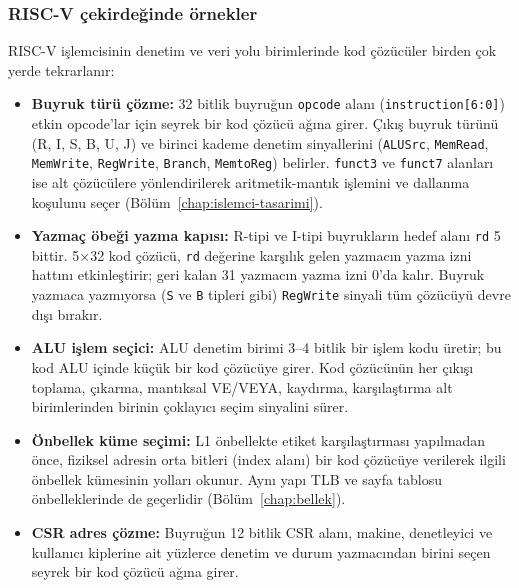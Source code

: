 \begin{ornek}[B.10]
\begin{center}
\end{center}
\end{ornek}


\subsubsection{RISC-V çekirdeğinde örnekler}
RISC-V işlemcisinin denetim ve veri yolu birimlerinde kod çözücüler birden çok yerde tekrarlanır:

\begin{itemize}[nosep]
  \item \textbf{Buyruk türü çözme:} 32 bitlik buyruğun \texttt{opcode} alanı (\texttt{instruction[6:0]}) etkin opcode'lar için seyrek bir kod çözücü ağına girer. Çıkış buyruk türünü (R, I, S, B, U, J) ve birinci kademe denetim sinyallerini (\texttt{ALUSrc}, \texttt{MemRead}, \texttt{MemWrite}, \texttt{RegWrite}, \texttt{Branch}, \texttt{MemtoReg}) belirler. \texttt{funct3} ve \texttt{funct7} alanları ise alt çözücülere yönlendirilerek aritmetik-mantık işlemini ve dallanma koşulunu seçer (Bölüm~\ref{chap:islemci-tasarimi}).
  \item \textbf{Yazmaç öbeği yazma kapısı:} R-tipi ve I-tipi buyrukların hedef alanı \texttt{rd} 5 bittir. 5×32 kod çözücü, \texttt{rd} değerine karşılık gelen yazmacın yazma izni hattını etkinleştirir; geri kalan 31 yazmacın yazma izni 0'da kalır. Buyruk yazmaca yazmıyorsa (\texttt{S} ve \texttt{B} tipleri gibi) \texttt{RegWrite} sinyali tüm çözücüyü devre dışı bırakır.
  \item \textbf{ALU işlem seçici:} ALU denetim birimi 3--4 bitlik bir işlem kodu üretir; bu kod ALU içinde küçük bir kod çözücüye girer. Kod çözücünün her çıkışı toplama, çıkarma, mantıksal VE/VEYA, kaydırma, karşılaştırma alt birimlerinden birinin çoklayıcı seçim sinyalini sürer.
  \item \textbf{Önbellek küme seçimi:} L1 önbellekte etiket karşılaştırması yapılmadan önce, fiziksel adresin orta bitleri (index alanı) bir kod çözücüye verilerek ilgili önbellek kümesinin yolları okunur. Aynı yapı TLB ve sayfa tablosu önbelleklerinde de geçerlidir (Bölüm~\ref{chap:bellek}).
  \item \textbf{CSR adres çözme:} Buyruğun 12 bitlik CSR alanı, makine, denetleyici ve kullanıcı kiplerine ait yüzlerce denetim ve durum yazmacından birini seçen seyrek bir kod çözücü ağına girer.
\end{itemize}


